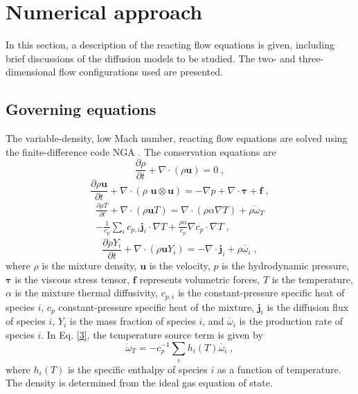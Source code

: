 \documentclass[preprint,review,12pt]{elsarticle}
\begin{document}
\section{Numerical approach}\label{sec:numericalapproach}
In this section, a description of the reacting flow equations is given, including brief discussions of the diffusion models to be studied. The two- and three-dimensional flow configurations used are presented.

\subsection{Governing equations}
The variable-density, low Mach number, reacting flow equations are solved using
the finite-difference code NGA \cite{Desjardins2008,Savard2015AChemistry}.
The conservation equations are
%
\begin{equation} \label{1}
\frac{\partial\rho}{\partial t}+\nabla\cdotp(\rho\textbf{u})= 0 \;,
\end{equation}
%
\begin{equation} \label{2}
\frac{\partial\rho \textbf{u}}{\partial t}+\nabla\cdotp(\rho\textbf{ u}\otimes\textbf{u})=-\nabla p+\nabla\cdotp\boldsymbol{\tau}+\textbf{f} \;,
\end{equation}
%
\begin{equation} \label{3}
\begin{split}
\frac{\partial\rho T}{\partial t}+\nabla\cdotp(\rho \textbf{u}T)=\nabla\cdotp(\rho\alpha\nabla T)+\rho\dot{\omega}_{T}\\
-\frac{1}{c_{p}}\sum_{i} c_{p,i}\textbf{j}_{i} \cdotp \nabla T+\frac{\rho\alpha}{c_{p}}\nabla{c_{p}}\cdotp\nabla T \;,
\end{split}
\end{equation}
%
\begin{equation} \label{4} 
\frac{\partial\rho Y_{i}}{\partial t}+\nabla\cdotp(\rho \textbf{u} Y_{i})=-\nabla\cdotp \textbf{j}_{i}+\rho\dot{\omega_{i}} \;,
\end{equation}
where $\rho$ is the mixture density, $\textbf{u}$ is the velocity, $p$ is the hydrodynamic pressure, $\boldsymbol{\tau}$ is the viscous stress tensor, $\textbf{f}$ represents volumetric forces, $T$ is the temperature, $\alpha$ is the mixture thermal diffusivity, $c_{p,i}$ is the constant-pressure specific heat of species $i$, $c_{p}$ constant-pressure specific heat of the mixture, $\textbf{j}_{i}$ is the diffusion flux of species $i$, $Y_{i}$ is the mass fraction of species $i$, and $\dot{\omega_{i}}$ is the production rate of species $i$.
In Eq. \eqref{3}, the temperature source term is given by
\begin{equation} \label{5}
\dot{\omega}_{T}=-c_{p}^{-1}\sum_{i} h_{i}(T)\dot{\omega_{i}} \;,
\end{equation}
where $h_{i}(T)$ is the specific enthalpy of species $i$ as a function of temperature.
The density is determined from the ideal gas equation of state.
\end{document}
